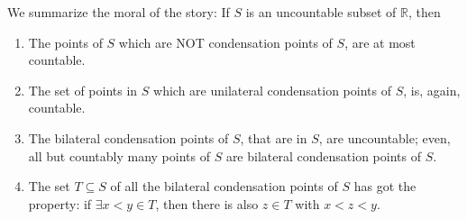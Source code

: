 \documentclass[12pt]{article}
\begin{document}
We summarize the moral of the story: If $S$ is an uncountable subset of $\mathbb R$, then
\begin{enumerate}
\item The points of $S$ which are NOT condensation points of $S$, are at most countable.
\item The set of points in $S$ which are unilateral condensation points of $S$, is, again, countable.
\item The bilateral condensation points of $S$, that are in $S$, are uncountable; even, all but countably many points of $S$ are bilateral condensation points of $S$. 
\item The set $T\subseteq S$ of all the bilateral condensation points of $S$ has got the property: if $\exists x<y\in T$, then there is also $z\in T$ with $x<z<y$.
\end{enumerate}
\end{document}
